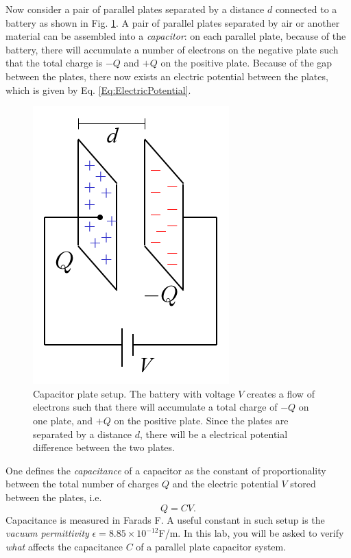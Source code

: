 \documentclass[12pt]{report}
\begin{document}
Now consider a pair of parallel plates separated by a distance $d$ connected to a battery as shown in Fig. \ref{Fig:ParallelPlates}. A pair of parallel plates separated by air or another material can be assembled into a \textit{capacitor}: on each parallel plate, because of the battery, there will accumulate a number of electrons on the negative plate such that the total charge is $-Q$ and $+Q$ on the positive plate. Because of the gap between the plates, there now exists an electric potential between the plates, which is given by Eq. \eqref{Eq:ElectricPotential}.
\begin{figure}[h]
\centering
\includegraphics[scale=0.6]{lab1-parallel-plates.png}
\caption{Capacitor plate setup. The battery with voltage $V$ creates a flow of electrons such that there will accumulate a total charge of $-Q$ on one plate, and $+Q$ on the positive plate. Since the plates are separated by a distance $d$, there will be a electrical potential difference between the two plates.}
\label{Fig:ParallelPlates}
\end{figure}

One defines the \textit{capacitance} of a capacitor as the constant of proportionality between the total number of charges $Q$ and the electric potential $V$ stored between the plates, i.e. 
\begin{equation}
Q = C V.
\label{capacitor_formula}
\end{equation}
Capacitance is measured in Farads F. A useful constant in such setup is the \textit{vacuum permittivity} $\epsilon = 8.85 \times 10^{-12}$F/m. In this lab, you will be asked to verify \textit{what} affects the capacitance $C$ of a parallel plate capacitor system.
\end{document}
